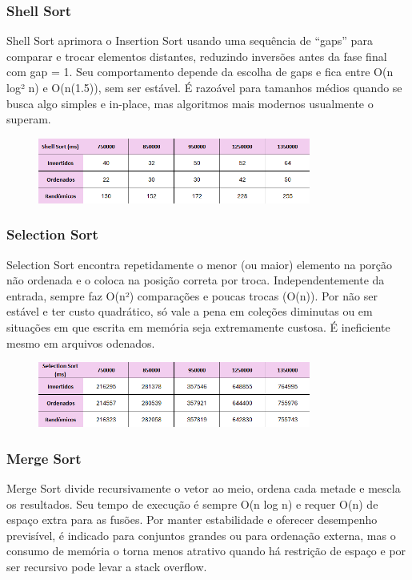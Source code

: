 \documentclass[a4paper, 12pt]{article}
\begin{document}
        \subsubsection{Shell Sort}
            Shell Sort aprimora o Insertion Sort usando uma sequência de “gaps” para comparar e trocar elementos distantes, reduzindo inversões antes da fase final com gap = 1. Seu comportamento depende da escolha de gaps e fica entre O(n log² n) e O(n(1.5)), sem ser estável. É razoável para tamanhos médios quando se busca algo simples e in-place, mas algoritmos mais modernos usualmente o superam.

            \begin{figure}[ht]
                \centering
                \includegraphics[width=0.8\textwidth]{images/shell.png}
            \end{figure}

        \subsubsection{Selection Sort}
            Selection Sort encontra repetidamente o menor (ou maior) elemento na porção não ordenada e o coloca na posição correta por troca. Independentemente da entrada, sempre faz O(n²) comparações e poucas trocas (O(n)). Por não ser estável e ter custo quadrático, só vale a pena em coleções diminutas ou em situações em que escrita em memória seja extremamente custosa. É ineficiente mesmo em arquivos odenados.

            \begin{figure}[ht]
                \centering
                \includegraphics[width=0.8\textwidth]{images/selection.png}
            \end{figure}

        \subsubsection{Merge Sort}
            Merge Sort divide recursivamente o vetor ao meio, ordena cada metade e mescla os resultados. Seu tempo de execução é sempre O(n log n) e requer O(n) de espaço extra para as fusões. Por manter estabilidade e oferecer desempenho previsível, é indicado para conjuntos grandes ou para ordenação externa, mas o consumo de memória o torna menos atrativo quando há restrição de espaço e por ser recursivo pode levar a stack overflow.
\end{document}
